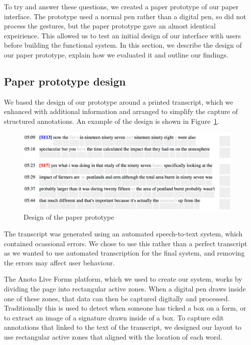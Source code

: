 To try and answer these questions, we created a paper prototype of our paper interface. The prototype used a normal pen
rather than a digital pen, so did not process the gestures, but the paper prototype gave an almost identical
expeirience. This allowed us to test an initial design of our interface with users before building the functional
system.  In this section, we describe the design of our paper prototype, explain how we evaluated it and outline our
findings.

\subsection{Paper prototype design}

We based the design of our prototype around a printed transcript, which we enhanced with additional information and
arranged to simplify the capture of structured annotations. An example of the design is shown in
Figure~\ref{fig:paper-prototype-design}.

\begin{figure}[h]
  \centering
  \includegraphics[width=\columnwidth]{figs/paper-prototype-design}
  \caption{Design of the paper prototype}
  \label{fig:paper-prototype-design}
\end{figure}

The transcript was generated using an automated speech-to-text system, which contained ocassional errors. We chose to
use this rather than a perfect transcript as we wanted to use automated transcription for the final system, and
removing the errors may affect user behaviour.

The Anoto Live Forms platform, which we used to create our system, works by dividing the page into rectangular active
zones.  When a digital pen draws inside one of these zones, that data can then be captured digitally and processed.
Traditionally this is used to detect when someone has ticked a box on a form, or to extract an image of a signature
drawn inside of a box.  To capture edit annotations that linked to the text of the transcript, we designed our layout
to use rectangular active zones that aligned with the location of each word.

